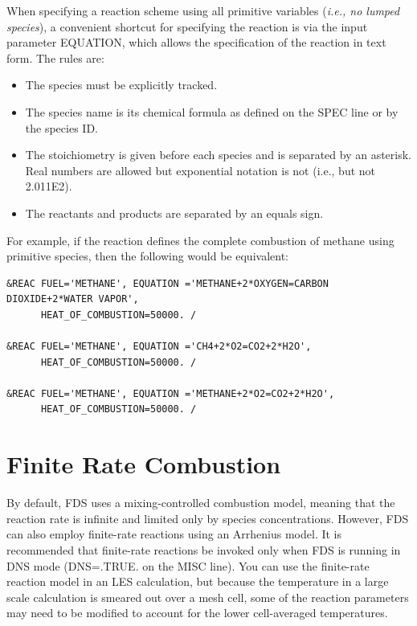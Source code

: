 \documentclass[11pt]{book}
\begin{document}
When specifying a reaction scheme using all primitive variables ({\em i.e., no lumped species}), a convenient shortcut for specifying the reaction is via the input parameter {\ct EQUATION}, which allows the specification of the reaction in text form.  The rules are:

\begin{itemize}
\item The species must be explicitly tracked.
\item The species name is its chemical formula as defined on the {\ct SPEC} line or by the species {\ct ID}.
\item The stoichiometry is given before each species and is separated by an asterisk. Real numbers are allowed but exponential notation is not (i.e., {} but not {\ct 2.011E2}).
\item The reactants and products are separated by an equals sign.
\end{itemize}

\noindent For example, if the reaction defines the complete combustion of methane using primitive species, then the following would be equivalent:

\begin{lstlisting}
&REAC FUEL='METHANE', EQUATION ='METHANE+2*OXYGEN=CARBON DIOXIDE+2*WATER VAPOR',
      HEAT_OF_COMBUSTION=50000. /

&REAC FUEL='METHANE', EQUATION ='CH4+2*O2=CO2+2*H2O',
      HEAT_OF_COMBUSTION=50000. /

&REAC FUEL='METHANE', EQUATION ='METHANE+2*O2=CO2+2*H2O',
      HEAT_OF_COMBUSTION=50000. /
\end{lstlisting}





\section{Finite Rate Combustion}
\label{info:finite}

By default, FDS uses a mixing-controlled combustion model, meaning that the reaction rate is infinite and limited only by species concentrations. However, FDS can also employ finite-rate reactions using an Arrhenius model. It is recommended that finite-rate reactions be invoked only
when FDS is running in DNS mode ({\ct DNS=.TRUE.} on the {\ct MISC} line).
You can use the finite-rate reaction model in an
LES calculation, but because the temperature in a large scale calculation
is smeared out over a mesh cell, some of the reaction parameters may need
to be modified to account for the lower cell-averaged temperatures.
\end{document}
